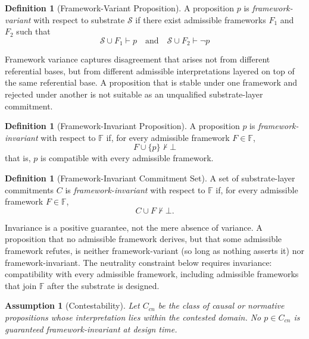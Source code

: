 \documentclass[11pt]{article}
\theoremstyle{plain}
\newtheorem{assumption}[theorem]{Assumption}
\theoremstyle{definition}
\newtheorem{definition}[theorem]{Definition}
\theoremstyle{remark}
\newcommand{\Substrate}{\mathcal{S}}
\newcommand{\Frameworks}{\mathbb{F}}
\newcommand{\Framework}{F}
\newcommand{\FrameworkOne}{F_1}
\newcommand{\FrameworkTwo}{F_2}
\newcommand{\entails}{\vdash}
\newcommand{\notentails}{\nvdash}
\begin{document}
\begin{definition}[Framework-Variant Proposition]
  \label{se100.def.FrameworkVariant}
  A proposition $p$ is \emph{framework-variant} with respect to substrate
  $\Substrate$ if there exist admissible frameworks $\FrameworkOne$ and
  $\FrameworkTwo$ such that
  \[
    \Substrate \cup \FrameworkOne \entails p
    \quad\text{and}\quad
    \Substrate \cup \FrameworkTwo \entails \neg p
  \]
\end{definition}

Framework variance captures disagreement that arises not from different
referential bases,
but from different admissible interpretations layered on top
of the same referential base.
A proposition that is stable under one framework
and rejected under another is not suitable as an unqualified substrate-layer
commitment.

\begin{definition}[Framework-Invariant Proposition]
  \label{se100.def.FrameworkInvariant}
  A proposition $p$ is \emph{framework-invariant} with respect to $\Frameworks$
  if, for every admissible framework $\Framework \in \Frameworks$,
  \[
    \Framework \cup \{p\} \notentails \bot
  \]
  that is, $p$ is compatible with every admissible framework.
\end{definition}

\begin{definition}[Framework-Invariant Commitment Set]
  \label{se100.def.FrameworkInvariantCommitmentSet}
  A set of substrate-layer commitments $C$ is \emph{framework-invariant} with
  respect to $\Frameworks$ if, for every admissible framework
  $\Framework \in \Frameworks$,
  \[
    C \cup \Framework \notentails \bot .
  \]
\end{definition}

Invariance is a positive guarantee, not the mere absence of variance. A
proposition that no admissible framework derives, but that some admissible
framework refutes, is neither framework-variant (so long as nothing asserts it)
nor framework-invariant.
The neutrality constraint below requires invariance:
compatibility with every admissible framework, including admissible frameworks
that join $\Frameworks$ after the substrate is designed.

\begin{assumption}[Contestability]
  \label{se100.def.Contestability}
  Let $C_{cn}$ be the class of causal or normative propositions
  whose interpretation lies within the contested domain.
  No $p \in C_{cn}$ is guaranteed framework-invariant at design time.
\end{assumption}
\end{document}
